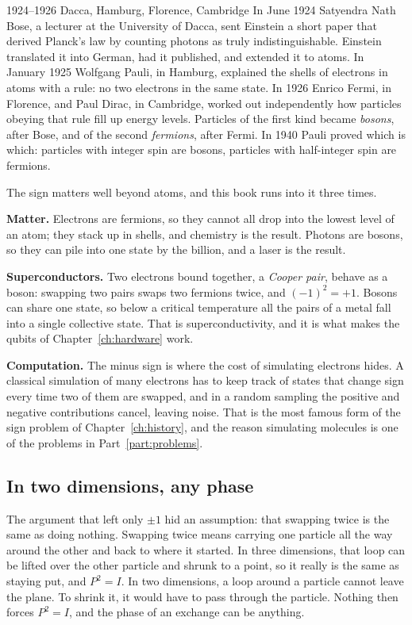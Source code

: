 \begin{history}{1924--1926 \textperiodcentered{} Dacca, Hamburg, Florence, Cambridge}
In June 1924 Satyendra Nath Bose, a lecturer at the University of Dacca, sent
Einstein a short paper that derived Planck's law by counting photons as truly
indistinguishable. Einstein translated it into German, had it published, and
extended it to atoms. In January 1925 Wolfgang Pauli, in Hamburg, explained the
shells of electrons in atoms with a rule: no two electrons in the same state. In
1926 Enrico Fermi, in Florence, and Paul Dirac, in Cambridge, worked out
independently how particles obeying that rule fill up energy levels. Particles of
the first kind became \emph{bosons}, after Bose, and of the second \emph{fermions},
after Fermi. In 1940 Pauli proved which is which: particles with integer spin are
bosons, particles with half-integer spin are fermions.
\end{history}

The sign matters well beyond atoms, and this book runs into it three times.

\textbf{Matter.} Electrons are fermions, so they cannot all drop into the lowest
level of an atom; they stack up in shells, and chemistry is the result. Photons are
bosons, so they can pile into one state by the billion, and a laser is the result.

\textbf{Superconductors.} Two electrons bound together, a \emph{Cooper pair}, behave
as a boson: swapping two pairs swaps two fermions twice, and $(-1)^2 = +1$. Bosons
can share one state, so below a critical temperature all the pairs of a metal fall
into a single collective state. That is superconductivity, and it is what makes the
qubits of Chapter~\ref{ch:hardware} work.

\textbf{Computation.} The minus sign is where the cost of simulating electrons
hides. A classical simulation of many electrons has to keep track of states that
change sign every time two of them are swapped, and in a random sampling the
positive and negative contributions cancel, leaving noise. That is the most famous
form of the sign problem of Chapter~\ref{ch:history}, and the reason simulating
molecules is one of the problems in Part~\ref{part:problems}.

\subsection*{In two dimensions, any phase}

The argument that left only $\pm1$ hid an assumption: that swapping twice is the
same as doing nothing. Swapping twice means carrying one particle all the way around
the other and back to where it started. In three dimensions, that loop can be lifted
over the other particle and shrunk to a point, so it really is the same as staying
put, and $P^2 = I$. In two dimensions, a loop around a particle cannot leave the
plane. To shrink it, it would have to pass through the particle. Nothing then forces
$P^2 = I$, and the phase of an exchange can be anything.

